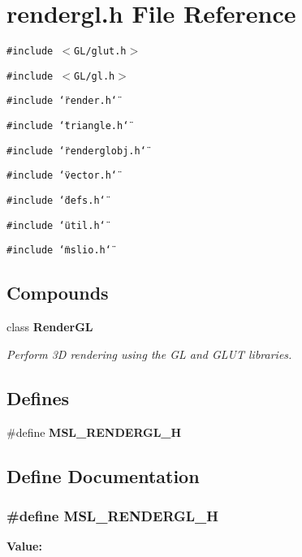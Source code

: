 \section{rendergl.h File Reference}
\label{rendergl_8h}
{\tt \#include $<$GL/glut.h$>$}\par
{\tt \#include $<$GL/gl.h$>$}\par
{\tt \#include \char`\"{}render.h\char`\"{}}\par
{\tt \#include \char`\"{}triangle.h\char`\"{}}\par
{\tt \#include \char`\"{}renderglobj.h\char`\"{}}\par
{\tt \#include \char`\"{}vector.h\char`\"{}}\par
{\tt \#include \char`\"{}defs.h\char`\"{}}\par
{\tt \#include \char`\"{}util.h\char`\"{}}\par
{\tt \#include \char`\"{}mslio.h\char`\"{}}\par
\subsection*{Compounds}
\begin{CompactItemize}
\item 
class {\bf Render\-GL}
\begin{CompactList}\small\item\em Perform 3D rendering using the GL and GLUT libraries.\item\end{CompactList}\end{CompactItemize}
\subsection*{Defines}
\begin{CompactItemize}
\item 
\#define {\bf MSL\_\-RENDERGL\_\-H}
\end{CompactItemize}


\subsection{Define Documentation}
\subsubsection{\setlength{\rightskip}{0pt plus 5cm}\#define MSL\_\-RENDERGL\_\-H}\label{rendergl_8h_a0}


{\bf Value:}\footnotesize\begin{verbatim}
\end{verbatim}\normalsize 
